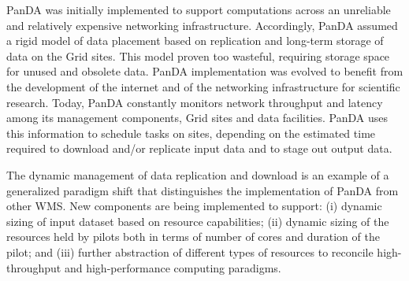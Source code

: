 PanDA was initially implemented to support computations across an unreliable and
relatively expensive networking infrastructure. Accordingly, PanDA assumed a
rigid model of data placement based on replication and long-term storage of data
on the Grid sites. This model proven too wasteful, requiring storage space for
unused and obsolete data. PanDA implementation was evolved to benefit from the
development of the internet and of the networking infrastructure for scientific
research. Today, PanDA constantly monitors network throughput and latency among
its management components, Grid sites and data facilities. PanDA uses this
information to schedule tasks on sites, depending on the estimated time required
to download and/or replicate input data and to stage out output data.

The dynamic management of data replication and download is an example of a
generalized paradigm shift that distinguishes the implementation of PanDA from
other WMS. New components are being implemented to support: (i) dynamic sizing
of input dataset based on resource capabilities; (ii) dynamic sizing of the
resources held by pilots both in terms of number of cores and duration of the
pilot; and (iii) further abstraction of different types of resources to
reconcile high-throughput and high-performance computing paradigms.

%



